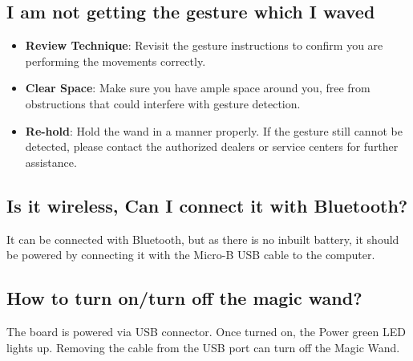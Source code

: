 \subsection{I am not getting the gesture which I waved}
\begin{itemize}
	\item \textbf{Review Technique}: Revisit the gesture instructions to confirm you are performing the movements correctly.
	\item \textbf{Clear Space}: Make sure you have ample space around you, free from obstructions that could interfere with gesture detection.
	\item \textbf{Re-hold}: Hold the wand in a manner properly. If the gesture still cannot be detected, please contact the authorized dealers or service centers for further assistance.
\end{itemize}

\subsection{Is it wireless, Can I connect it with Bluetooth?}
It can be connected with Bluetooth, but as there is no inbuilt battery, it should be powered by connecting it with the Micro-B USB cable to the computer.

\subsection{How to turn on/turn off the magic wand?}
The board is powered via USB connector. Once turned on, the Power green LED lights up. Removing the cable from the USB port can turn off the Magic Wand.






